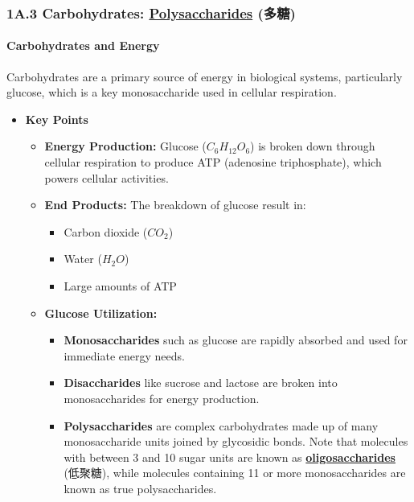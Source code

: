 
\subsubsection{1A.3 Carbohydrates: \underline{Polysaccharides} (多糖)}
\paragraph{Carbohydrates and Energy}
Carbohydrates are a primary source of energy in biological systems, particularly glucose, which is a key monosaccharide used in
cellular respiration.
\begin{itemize}
    \item \textbf{Key Points}
    \begin{itemize}
        \item \textbf{Energy Production:} Glucose ($C_6H_{12}O_6$) is broken down through cellular respiration to produce ATP
        (adenosine triphosphate), which powers cellular activities.
        \item \textbf{End Products:} The breakdown of glucose result in:
        \begin{itemize}
            \item Carbon dioxide ($CO_2$)
            \item Water ($H_2O$)
            \item Large amounts of ATP
        \end{itemize}
        \item \textbf{Glucose Utilization:}
        \begin{itemize}
            \item \textbf{Monosaccharides} such as glucose are rapidly absorbed and used for immediate energy needs.
            \item \textbf{Disaccharides} like sucrose and lactose are broken into monosaccharides for energy production.
            \item \textbf{Polysaccharides} are complex carbohydrates made up of many monosaccharide units joined by glycosidic
            bonds. Note that molecules with between 3 and 10 sugar units are known as \underline{\textbf{oligosaccharides}}
            (低聚糖), while molecules containing 11 or more monosaccharides are known as true polysaccharides.
            \begin{figure}[H]

\end{figure}
\end{itemize}
\end{itemize}
\end{itemize}
